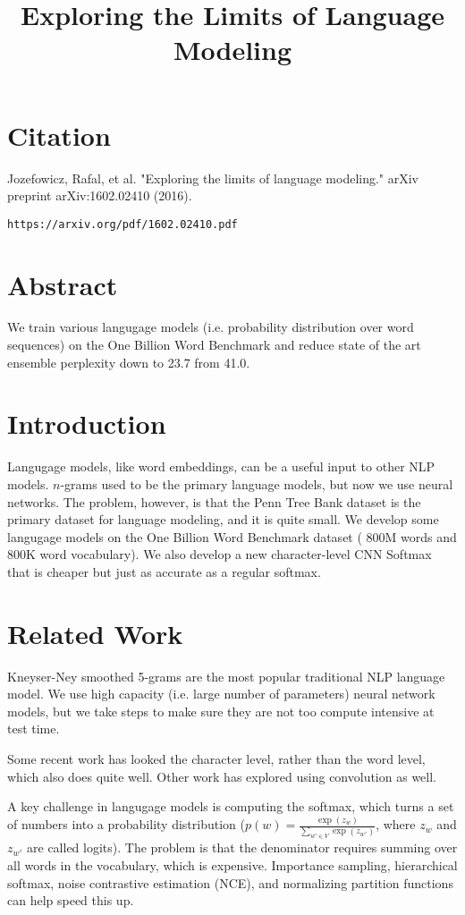 \documentclass[a4paper]{article}
\title{Exploring the Limits of Language Modeling}
\date{}
\begin{document}
\maketitle

\section{Citation}
Jozefowicz, Rafal, et al. "Exploring the limits of language modeling." arXiv preprint arXiv:1602.02410 (2016).

\begin{verbatim}
https://arxiv.org/pdf/1602.02410.pdf
\end{verbatim}

\section{Abstract}
We train various langugage models (i.e. probability distribution over word
sequences) on the One Billion Word Benchmark and reduce state of the art
ensemble perplexity down to 23.7 from 41.0.

\section{Introduction}
Langugage models, like word embeddings, can be a useful input to other NLP
models. $n$-grams used to be the primary language models, but now we use
neural networks. The problem, however, is that the Penn Tree Bank dataset
is the primary dataset for language modeling, and it is quite small. We
develop some langugage models on the One Billion Word Benchmark dataset (
800M words and 800K word vocabulary). We also develop a new character-level
CNN Softmax that is cheaper but just as accurate as a regular softmax.

\section{Related Work}
Kneyser-Ney smoothed 5-grams are the most popular traditional NLP language
model. We use high capacity (i.e. large number of parameters) neural network
models, but we take steps to make sure they are not too compute intensive
at test time.

Some recent work has looked the character level, rather than the word level,
which also does quite well. Other work has explored using convolution as well.

A key challenge in langugage models is computing the softmax, which turns
a set of numbers into a probability distribution
($p(w) = \frac{\exp(z_w)}{\sum_{w' \in V}{\exp(z_{w'})}}$, where $z_w$ and $z_{w'}$
are called logits). The problem
is that the denominator requires summing over all words in the vocabulary,
which is expensive. Importance sampling, hierarchical softmax, noise contrastive
estimation (NCE), and normalizing partition functions can help speed this up.
\end{document}
